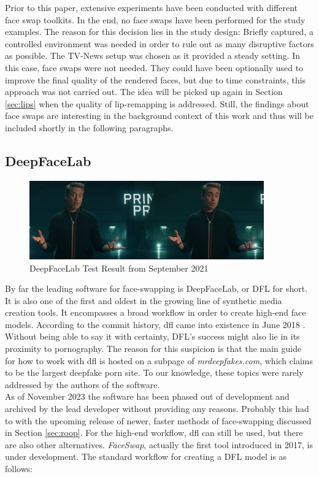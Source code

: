 \documentclass[
  a4paper,  %
  twoside,  %
  bibliography=totoc,
  headsepline,
  cleardoublepage=empty,
  parskip=half,
  draft=false
]{scrbook}
\begin{document}
Prior to this paper, extensive experiments have been conducted with different face swap toolkits. In the end, no face swaps have been performed for the study examples. The reason for this decision lies in the study design: Briefly captured, a controlled environment was needed in order to rule out as many disruptive factors as possible. The TV-News setup was chosen as it provided a steady setting. In this case, face swaps were not needed. They could have been optionally used to improve the final quality of the rendered faces, but due to time constraints, this approach was not carried out. The idea will be picked up again in Section \ref{sec:lips} when the quality of lip-remapping is addressed.
Still, the findings about face swaps are interesting in the background context of this work and thus will be included shortly in the following paragraphs.

\subsection{DeepFaceLab}
\begin{figure}[h]
  \centering
  \includegraphics[width=0.9\textwidth]{./graphics/dfl-demo.png}
  \caption{DeepFaceLab Test Result from September 2021}
  \label{fig:dfl-sample}
\end{figure}
By far the leading software for face-swapping is DeepFaceLab, or DFL for short. It is also one of the first and oldest in the growing line of synthetic media creation tools. It encompasses a broad workflow in order to create high-end face models. According to the commit history, \gls{dfl} came into existence in June 2018 \cite{iperovCommitsIperovDeepFaceLab}. Without being able to say it with certainty, DFL's success might also lie in its proximity to pornography. The reason for this suspicion is that the main guide for how to work with \gls{dfl} is hosted on a subpage of \textit{mrdeepfakes.com}, which claims to be the largest deepfake porn site. To our knowledge, these topics were rarely addressed by the authors of the software.\\
As of November 2023 the software has been phased out of development and archived by the lead developer without providing any reasons. Probably this had to with the upcoming release of newer, faster methods of face-swapping discussed in Section \ref{sec:roop}. For the high-end workflow, \gls{dfl} can still be used, but there are also other alternatives. \textit{FaceSwap}, actually the first tool introduced in 2017, is under development. The standard workflow for creating a DFL model is as follows:
\end{document}
